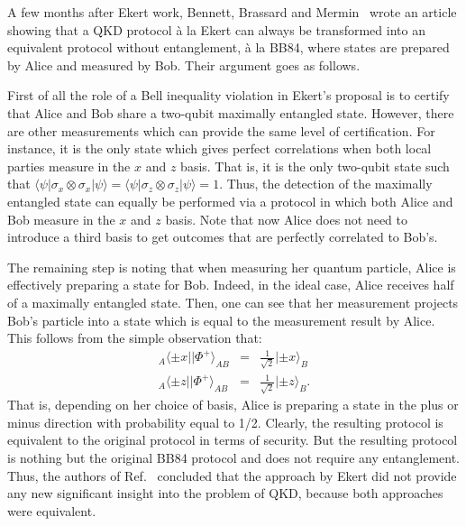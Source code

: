 \documentclass[a4paper]{article}
\def\bra#1{\langle#1|} \def\ket#1{|#1\rangle}
\begin{document}
A few months after Ekert work, Bennett, Brassard and
Mermin~\cite{BBM} wrote an article showing that a QKD protocol \`a
la Ekert can always be transformed into an equivalent protocol
without entanglement, \`a la BB84, where states are prepared by
Alice and measured by Bob. Their argument goes as follows.

First of all the role of a Bell inequality violation in Ekert's
proposal is to certify that Alice and Bob share a two-qubit
maximally entangled state. However, there are other measurements
which can provide the same level of certification. For instance,
it is the only state which gives perfect correlations when both
local parties measure in the $x$ and $z$ basis. That is, it is the
only two-qubit state such that
$\bra{\psi}\sigma_x\otimes\sigma_x\ket{\psi}=
\bra{\psi}\sigma_z\otimes\sigma_z\ket{\psi}=1$. Thus, the detection of the maximally entangled state
can equally be performed via a protocol in which
both Alice and Bob measure in the $x$ and $z$ basis. Note that now
Alice does not need to introduce a third basis to get outcomes
that are perfectly correlated to Bob's.

The remaining step is noting that when measuring her quantum
particle, Alice is effectively preparing a state for Bob. Indeed,
in the ideal case, Alice receives half of a maximally entangled
state. Then, one can see that her measurement projects Bob's
particle into a state which is equal to the measurement result by
Alice. This follows from the simple observation that:
\begin{eqnarray}
  _A\bra{\pm x}\ket{\Phi^+}_{AB} &=& \frac{1}{\sqrt 2}\ket{\pm x}_B \nonumber\\
  _A\bra{\pm z}\ket{\Phi^+}_{AB} &=& \frac{1}{\sqrt 2}\ket{\pm
  z}_B .
\end{eqnarray}
That is, depending on her choice of basis, Alice is preparing a
state in the plus or minus direction with probability equal to
1/2. Clearly, the resulting protocol is equivalent to the original
protocol in terms of security. But the resulting protocol is
nothing but the original BB84 protocol and does not require any
entanglement. Thus, the authors of Ref.~\cite{BBM} concluded that
the approach by Ekert did not provide any new significant insight
into the problem of QKD, because both approaches were equivalent.
\end{document}
